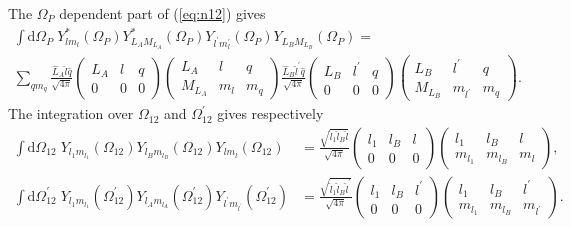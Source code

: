\documentclass[notitlepage,a4paper,final,amsfonts,amsmath,amssymb]{revtex4-1}
\begin{document}
The $\Omega_P$ dependent part of (\ref{eq:n12}) gives
\begin{multline}
  \int \mathrm{d} \Omega_P \;
  Y_{lm_l}^*(\Omega_{P})
Y_{L_A M_{L_A}}^*(\Omega_P)
  Y_{l^\prime m_l^\prime} (\Omega_{P})
Y_{L_B M_{L_B}} (\Omega_P)
=  \\
\sum_{q m_q} 
\frac{ \hat{L}_A \hat{l} \hat{q} }{\sqrt{4\pi}}
\begin{pmatrix}
  L_A & l & q \\
  0 & 0 & 0
\end{pmatrix}
\begin{pmatrix}
  L_A & l & q \\
  M_{L_A} & m_l & m_q
\end{pmatrix}
\frac{ \hat{L}_B \hat{l}^\prime \hat{q} }{\sqrt{4\pi}}
\begin{pmatrix}
  L_B & l^\prime & q \\
  0 & 0 & 0
\end{pmatrix}
\begin{pmatrix}
  L_B & l^\prime & q \\
  M_{L_B} & m_{l^\prime} & m_q
\end{pmatrix}.
\end{multline}
The integration over $\Omega_{12}$ and $\Omega_{12}^\prime$ gives respectively
\begin{align}
  \int \mathrm{d} \Omega_{12} \; 
  Y_{l_1 m_{l_1}}(\Omega_{12})
  Y_{l_B m_{l_B}}(\Omega_{12})
  Y_{l m_{l}}(\Omega_{12})
  & = 
  \frac{\sqrt{ \hat{l}_1 \hat{l}_B \hat{l}}}{\sqrt{4\pi}} 
  \begin{pmatrix}
    l_1 & l_B & l \\
    0 & 0 & 0
  \end{pmatrix}
  \begin{pmatrix}
    l_1 & l_B & l \\
    m_{l_1} & m_{l_B} & m_l
  \end{pmatrix},
 \\
  \int \mathrm{d} \Omega_{12}^\prime  \; 
  Y_{l_1 m_{l_1}}(\Omega_{12}^\prime )
  Y_{l_A m_{l_A}}(\Omega_{12}^\prime )
  Y_{l^\prime m_{l^\prime}}(\Omega_{12}^\prime )
  & = \frac{\sqrt{ \hat{l}_1 \hat{l}_B \hat{l}^\prime }}{\sqrt{4\pi}} 
  \begin{pmatrix}
    l_1 & l_B & l^\prime \\
    0 & 0 & 0
  \end{pmatrix}
  \begin{pmatrix}
    l_1 & l_B & l^\prime \\
    m_{l_1} & m_{l_B} & m_{l^\prime}
  \end{pmatrix}.
\end{align}
\end{document}
